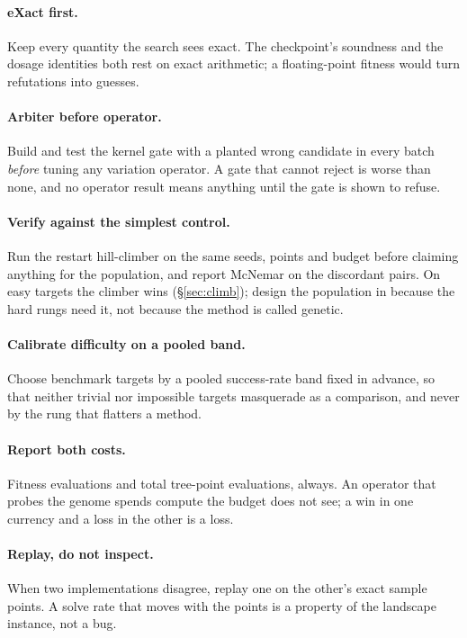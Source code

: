 \documentclass[11pt,a4paper]{article}
\theoremstyle{definition}
\theoremstyle{remark}
\begin{document}
\paragraph{eXact first.} Keep every quantity the search sees exact. The
checkpoint's soundness and the dosage identities both rest on exact arithmetic;
a floating-point fitness would turn refutations into guesses.

\paragraph{Arbiter before operator.} Build and test the kernel gate with a
planted wrong candidate in every batch \emph{before} tuning any variation
operator. A gate that cannot reject is worse than none, and no operator result
means anything until the gate is shown to refuse.

\paragraph{Verify against the simplest control.} Run the restart hill-climber on
the same seeds, points and budget before claiming anything for the population,
and report McNemar on the discordant pairs. On easy targets the climber wins
(\S\ref{sec:climb}); design the population in because the hard rungs need it,
not because the method is called genetic.

\paragraph{Calibrate difficulty on a pooled band.} Choose benchmark targets by a
pooled success-rate band fixed in advance, so that neither trivial nor
impossible targets masquerade as a comparison, and never by the rung that
flatters a method.

\paragraph{Report both costs.} Fitness evaluations and total tree-point
evaluations, always. An operator that probes the genome spends compute the
budget does not see; a win in one currency and a loss in the other is a loss.

\paragraph{Replay, do not inspect.} When two implementations disagree, replay
one on the other's exact sample points. A solve rate that moves with the points
is a property of the landscape instance, not a bug.
\end{document}
